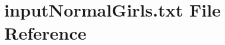 \hypertarget{inputNormalGirls_8txt}{}\section{input\+Normal\+Girls.\+txt File Reference}
\label{inputNormalGirls_8txt}
